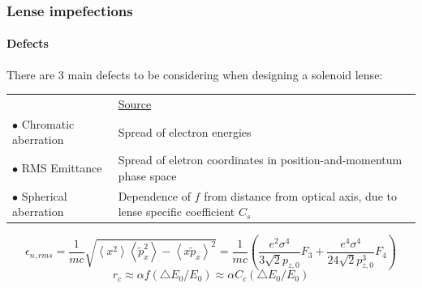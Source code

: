 \documentclass{beamer}
\begin{document}
  \begin{frame}
  \frametitle{Lense impefections}
  \framesubtitle{Defects}
\begin{small}
  There are 3 main defects to be considering when designing a solenoid lense:
  \begin{table}[t]
  \centering
  \begin{tabular}{   m{5cm}  m{5cm}  } 
    &  \underline{Source} \\ 
   $\bullet$ Chromatic aberration & Spread of electron energies  \\ 
   $\bullet$ RMS Emittance  &   Spread of eletron coordinates in position-and-momentum phase space \\ 
   $\bullet$ Spherical aberration &  Dependence of $f$ from distance from optical axis, due to lense specific coefficient $ C_{s}$ \\ 
  \end{tabular}
  \end{table}
\end{small}
    \begin{tiny}
    \begin{equation}
\epsilon_{n,rms}=\frac{1}{mc}\sqrt{\left\langle x^{2}\right\rangle \left\langle \tilde{p}_{x}^{2}\right\rangle -\left\langle x\tilde{p}_{x}\right\rangle ^{2}}=\frac{1}{mc}\left(\frac{e^{2}\sigma^{4}}{3\sqrt{2}p_{z,0}}F_{3}+\frac{e^{4}\sigma^{4}}{24\sqrt{2}p_{z,0}^{3}}F_{4}\right)
    \end{equation}
     \begin{equation}
r_{c}\approx\alpha f\left(\triangle E_{0}/E_{0}\right)\approx\alpha C_{c}\left(\triangle E_{0}/E_{0}\right)
    \end{equation}
  \end{tiny}
  \end{frame}
\end{document}

